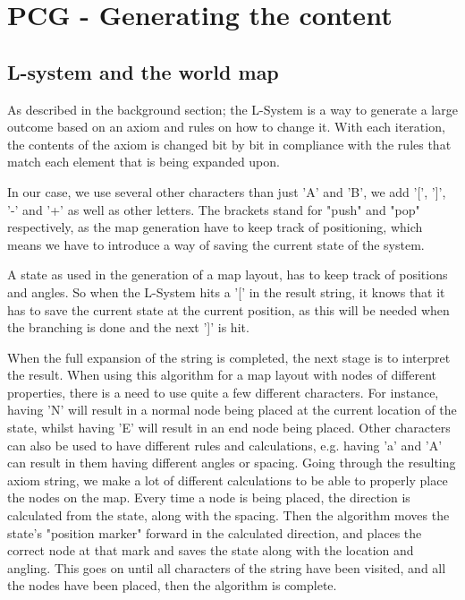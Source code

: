 \section{PCG - Generating the content}

\subsection{L-system and the world map}
\label{sec:lsys}
As described in the background section; the L-System is a way to generate a large outcome based on an axiom and rules on how to change it. With each iteration, the contents of the axiom is changed bit by bit in compliance with the rules that match each element that is being expanded upon.

In our case, we use several other characters than just 'A' and 'B', we add '[', ']', '-' and '+' as well as other letters. The brackets stand for "push" and "pop" respectively, as the map generation have to keep track of positioning, which means we have to introduce a way of saving the current state of the system.

A state as used in the generation of a map layout, has to keep track of positions and angles. So when the L-System hits a '[' in the result string, it knows that it has to save the current state at the current position, as this will be needed when the branching is done and the next ']' is hit. 

When the full expansion of the string is completed, the next stage is to interpret the result. When using this algorithm for a map layout with nodes of different properties, there is a need to use quite a few different characters. For instance, having 'N' will result in a normal node being placed at the current location of the state, whilst having 'E' will result in an end node being placed. Other characters can also be used to have different rules and calculations, e.g. having 'a' and 'A' can result in them having different angles or spacing.
Going through the resulting axiom string, we make a lot of different calculations to be able to properly place the nodes on the map. Every time a node is being placed, the direction is calculated from the state, along with the spacing. Then the algorithm moves the state's "position marker" forward in the calculated direction, and places the correct node at that mark and saves the state along with the location and angling.
This goes on until all characters of the string have been visited, and all the nodes have been placed, then the algorithm is complete.

